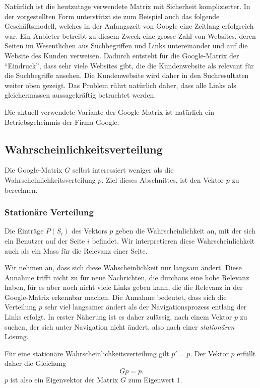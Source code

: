 Natürlich ist die heutzutage verwendete Matrix mit Sicherheit komplizierter.
In der vorgestellten Form unterstützt sie zum Beispiel auch das folgende
Geschäftsmodell, welches in der Anfangszeit von Google eine Zeitlang 
erfolgreich war.
Ein Anbieter betreibt zu diesem Zweck eine grosse Zahl von Websites,
deren Seiten im Wesentlichen aus Suchbegriffen und Links untereinander
und auf die Website des Kunden verweisen.
Dadurch entsteht für die Google-Matrix der ``Eindruck'', dass sehr viele
Websites gibt, die die Kundenwebsite als relevant für die Suchbegriffe 
ansehen.
Die Kundenwebsite wird daher in den Suchresultaten weiter oben gezeigt.
Das Problem rührt natürlich daher, dass alle Links als gleichermassen
aussagekräftig betrachtet werden.

Die aktuell verwendete Variante der Google-Matrix ist natürlich ein
Betriebsgeheimnis der Firma Google.

%
%
\subsection{Wahrscheinlichkeitsverteilung
\label{buch:subsection:wahrscheinlichkeitsverteilung}}
Die Google-Matrix $G$ selbst interessiert weniger als die
Wahrscheinlichkeitsverteilung $p$.
Ziel dieses Abschnittes, ist den Vektor $p$ zu berechnen.

\subsubsection{Stationäre Verteilung}
Die Einträge $P(S_i)$ des Vektors $p$ geben die Wahrscheinlichkeit an, mit
der sich ein Benutzer auf der Seite $i$ befindet.
Wir interpretieren diese Wahrscheinlichkeit auch als ein Mass für die
Relevanz einer Seite.

Wir nehmen an, dass sich diese Wahscheinlichkeit nur langsam ändert.
Diese Annahme trifft nicht zu für neue Nachrichten, die durchaus eine
hohe Relevanz haben, für es aber noch nicht viele Links geben kann,
die die Relevanz in der Google-Matrix erkennbar machen.
Die Annahme bedeutet, dass sich die Verteilung $p$ sehr viel langsamer 
ändert als der Navigationsprozess entlang der Links erfolgt.
In erster Näherung ist es daher zulässig, nach einem Vektor $p$ zu
suchen, der sich unter Navigation nicht ändert, also nach einer
{\em stationären} Lösung.
%

Für eine stationäre Wahrscheinlichkeitsverteilung gilt $p'=p$.
Der Vektor $p$ erfüllt daher die Gleichung
\begin{equation}
Gp = p.
\label{buch:google:ewgleichung}
\end{equation}
$p$ ist also ein Eigenvektor der Matrix $G$ zum Eigenwert $1$.

